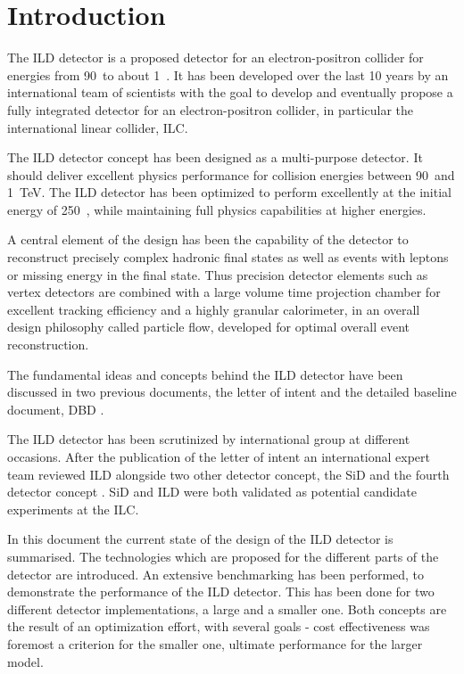 \chapter{Introduction}
The ILD detector is a proposed detector for an electron-positron collider for energies from 90~\GeV to about 1~\TeV. It has been developed over the last 10 years by an international team of scientists with the goal to develop and eventually propose a fully integrated detector for an electron-positron collider, in particular the international linear collider, ILC.

The ILD detector concept has been designed as a multi-purpose detector. It should deliver excellent physics performance for collision energies between 90~\GeV and 1~TeV. The ILD detector has been optimized to perform excellently at the initial  energy of 250~\GeV, while maintaining full physics capabilities at higher energies. 

 A central element of the design has been the capability of the detector to reconstruct precisely complex hadronic final states as well as events with leptons or missing energy in the final state. Thus precision detector elements such as vertex detectors are combined with a large volume time projection chamber for excellent tracking efficiency and a highly granular calorimeter, in an overall design philosophy called particle flow, developed for optimal overall event reconstruction. 

The fundamental ideas and concepts behind the ILD detector have been discussed in two previous documents, the letter of intent \cite{ild:bib:ILDloi} and the detailed baseline document, DBD \cite{ild:bib:ilddbd}. 

The ILD detector has been scrutinized by international group at different occasions. After the publication of the letter of intent \cite{ild:bib:ILDloi} an international expert team reviewed ILD alongside two other detector concept, the SiD \cite{bib:sid:loi} and the fourth detector concept \cite{bib:4th:loi}. SiD and ILD were both validated as potential candidate experiments at the ILC. 

In this document the current state of the design of the ILD detector is summarised. The technologies which are proposed for the different parts of the detector are introduced. An extensive benchmarking has been performed, to demonstrate the performance of the ILD detector. This has been done for two different detector implementations, a large and a smaller one. Both concepts are the result of an optimization effort, with several goals - cost effectiveness was foremost a criterion for the smaller one, ultimate performance for the larger model. 

